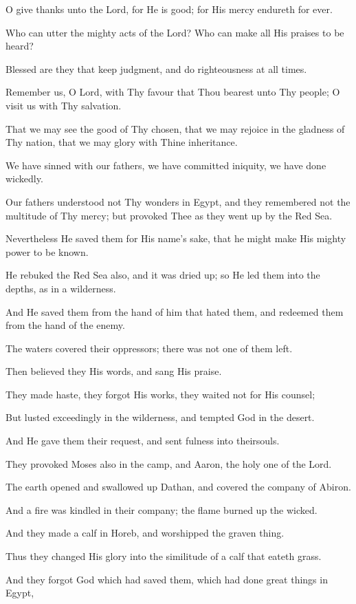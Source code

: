 O give thanks unto the Lord, for He is good; for His mercy endureth for ever.

Who can utter the mighty acts of the Lord? Who can make all His praises to be heard?

Blessed are they that keep judgment, and do righteousness at all times.

Remember us, O Lord, with Thy favour that Thou bearest unto Thy people; O visit us with Thy salvation.

That we may see the good of Thy chosen, that we may rejoice in the gladness of Thy nation, that we may glory with Thine inheritance.

We have sinned with our fathers, we have committed iniquity, we have done wickedly.

Our fathers understood not Thy wonders in Egypt, and they remembered not the multitude of Thy mercy; but provoked Thee as they went up by the Red Sea.

Nevertheless He saved them for His name's sake, that he might make His mighty power to be known.

He rebuked the Red Sea also, and it was dried up; so He led them into the depths, as in a wilderness.

And He saved them from the hand of him that hated them, and redeemed them from the hand of the enemy.

The waters covered their oppressors; there was not one of them left.

Then believed they His words, and sang His praise.

They made haste, they forgot His works, they waited not for His counsel;

But lusted exceedingly in the wilderness, and tempted God in the desert.

And He gave them their request, and sent fulness into theirsouls.

They provoked Moses also in the camp, and Aaron, the holy one of the Lord.

The earth opened and swallowed up Dathan, and covered the company of Abiron.

And a fire was kindled in their company; the flame burned up the wicked.

And they made a calf in Horeb, and worshipped the graven thing.

Thus they changed His glory into the similitude of a calf that eateth grass.

And they forgot God which had saved them, which had done great things in Egypt,


